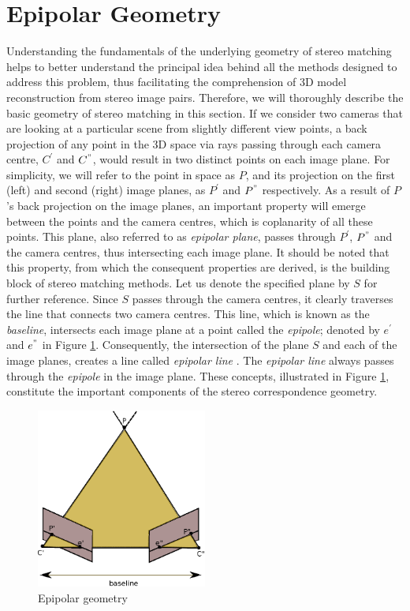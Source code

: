 \section{Epipolar Geometry}
Understanding the fundamentals of the underlying geometry of stereo matching helps to better understand the principal idea behind all the methods designed to address this problem, 
thus facilitating the comprehension of 3D model reconstruction from stereo image pairs. Therefore, we will thoroughly describe the basic geometry of stereo matching in this section. \newline
If we consider two cameras that are looking at a particular scene from slightly different view points, 
a back projection of any point in the 3D space via rays passing through each camera centre,
${C}^{'}$ and ${C}^{"}$, would result in two distinct points on each image plane. For simplicity, we will refer to the point 
in space as $P$, and its projection on the first (left) and second (right) image planes,
as $P^{'}$ and ${P}^{"}$ respectively. \newline
As a result of $P$'s back projection on the image planes, an important property will emerge between the points and the camera centres, which is coplanarity of all these points. 
This plane, also referred to as {\it epipolar plane}, passes through $P^{'}$, $P^{"}$ and the camera centres, thus intersecting each image plane. 
It should be noted that this property, from which the consequent properties are derived, is the building block of stereo matching methods. 
Let us denote the specified plane by $S$ for further reference. 
Since $S$ passes through the camera centres, it clearly traverses the line 
that connects two camera centres. This line, which is known as the {\it baseline}, intersects each image plane at a point called the {\it epipole}; denoted by ${e}^{'}$ and ${e}^{"}$
in Figure \ref{fig:epg}. 
Consequently, the intersection of the plane $S$ and each of the image planes, creates a line called {\it epipolar line} \cite{hart2000}. 
The {\it epipolar line} always passes through the {\it epipole} in the image plane. 
These concepts, illustrated in Figure \ref{fig:epg}, constitute the important components of the stereo correspondence geometry.

\begin{figure}[!h]
\centering
\includegraphics[width=0.5\textwidth]{epipole}
%
\caption{Epipolar geometry}
\label{fig:epg}
\end{figure} 

